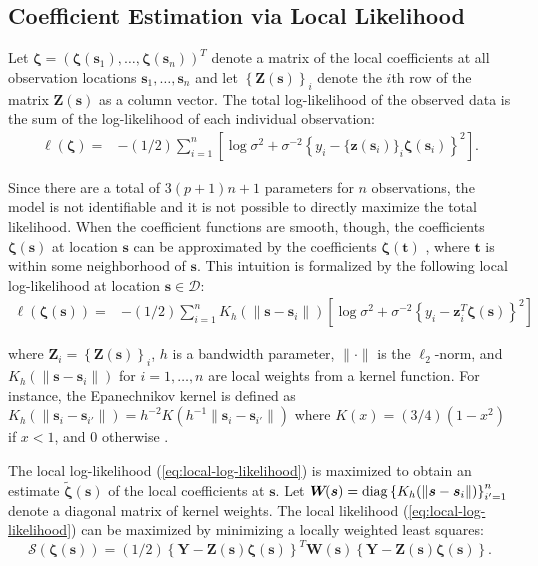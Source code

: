 \documentclass[authoryear,review, 12pt]{elsarticle}
\begin{document}
\subsection{Coefficient Estimation via Local Likelihood}




Let $\bm{\zeta}=\left(\bm{\zeta}(\bm{s}_{1}),\dots,\bm{\zeta}(\bm{s}_{n})\right)^{T}$
denote a matrix of the local coefficients at all observation locations
$\bm{s}_{1},\dots,\bm{s}_{n}$ and let $\left\{\bm{Z}(\bm{s})\right\}_{i}$ denote the
$i$th row of the matrix $\bm{Z}(\bm{s})$ as a column vector. The total log-likelihood of the observed
data is the sum of the log-likelihood of each individual observation:
\begin{align}
\ell\left(\bm{\zeta}\right)= & -(1/2)\sum_{i=1}^{n}\left[\log{\sigma^{2}}+\sigma^{-2}\left\{ y_{i}- \{\bm{z}(\bm{s}_i)\}_i \bm{\zeta}(\bm{s}_{i})\right\} ^{2}\right].\label{eq:coefficients}
\end{align}

Since there are a total of $3(p+1)n+1$ parameters for $n$ observations,
the model is not identifiable and it is not possible to directly maximize
the total likelihood. When the coefficient functions are smooth, though,
the coefficients $\bm{\zeta}(\bm{s})$ at location $\bm{s}$ can be
approximated by the coefficients $\bm{\zeta}(\bm{t})$ , where $\bm{t}$
is within some neighborhood of $\bm{s}$. This intuition is formalized
by the following local log-likelihood at location $\bm{s}\in\mathcal{D}$:
\begin{align}
\ell\left(\bm{\zeta}(\bm{s})\right)= & -(1/2)\sum_{i=1}^{n}K_{h}(\|\bm{s}-\bm{s}_{i}\|)\left[\log\sigma^{2}+\sigma^{-2}\left\{ y_{i}-\bm{z}_{i}^{T}\bm{\zeta}(\bm{s})\right\} ^{2}\right]\label{eq:local-log-likelihood}
\end{align}

where $\bm{Z}_{i}=\left\{\bm{Z}(\bm{s})\right\}_{i}$, $h$ is a bandwidth parameter, $\|\cdot\|$ is the $\ell_{2}$-norm,
and $K_{h}(\|\bm{s}-\bm{s}_{i}\|)$ for $i=1,\dots,n$ are local weights
from a kernel function. For instance, the Epanechnikov kernel is defined
as $K_{h}(\|\bm{s}_{i}-\bm{s}_{i'}\|)=h^{-2}K\left(h^{-1}\|\bm{s}_{i}-\bm{s}_{i'}\|\right)$
where $K(x)=(3/4)(1-x^{2})$ if $x<1$, and $0$ otherwise \citep{Samiuddin-el-Sayyad-1990}.

The local log-likelihood (\ref{eq:local-log-likelihood}) is maximized
to obtain an estimate $\tilde{\bm{\zeta}}(\bm{s})$ of the local coefficients
at $\bm{s}$. Let $\bm{W}\!(\bm{s})={\rm diag}\left\{ K_{h}(\|\bm{s}-\bm{s}_{i}\|)\right\} _{i'=1}^{n}$
denote a diagonal matrix of kernel weights. The local likelihood (\ref{eq:local-log-likelihood})
can be maximized by minimizing a locally weighted least squares: 
\begin{equation}
\mathcal{S}\left(\bm{\zeta}(\bm{s})\right)=(1/2)\left\{ \bm{Y}-\bm{Z}(\bm{s})\bm{\zeta}(\bm{s})\right\} ^{T}\bm{W}\!(\bm{s})\left\{ \bm{Y}-\bm{Z}(\bm{s})\bm{\zeta}(\bm{s})\right\} .\label{eq:local-sum-of-squares}
\end{equation}
\end{document}
